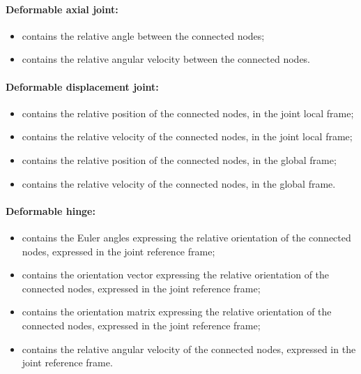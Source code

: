 \paragraph{Deformable axial joint:}
\begin{itemize}
\item {} contains the relative angle 
  between the connected nodes;
\item {} contains the relative angular
  velocity between the connected nodes. 
\end{itemize}

\paragraph{Deformable displacement joint:}
\begin{itemize}
\item {} contains the relative position
  of the connected nodes, in the joint local frame;
\item {} contains the relative velocity
  of the connected nodes, in the joint local frame;
\item {} contains the relative position
  of the connected nodes, in the global frame;
\item {} contains the relative velocity
  of the connected nodes, in the global frame. 
\end{itemize}

\paragraph{Deformable hinge:}
\begin{itemize}
\item {} contains the Euler angles 
  expressing the relative orientation of the connected nodes, expressed in 
  the joint reference frame;
\item {} contains the orientation vector
  expressing the relative orientation of the connected nodes, expressed in 
  the joint reference frame;
\item {} contains the orientation matrix
  expressing the relative orientation of the connected nodes, expressed in 
  the joint reference frame;
\item {} contains the relative angular
  velocity of the connected nodes, expressed in the joint reference frame.
\end{itemize}

